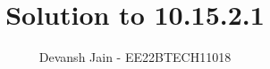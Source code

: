 \documentclass[journal,12pt,onecolumn]{IEEEtran}
\theoremstyle{remark}
\begin{document}
%




\vspace{3cm}

\title{Solution to 10.15.2.1}
\author{Devansh Jain - EE22BTECH11018}


%
%
%

% 
%



% 
\end{document}
